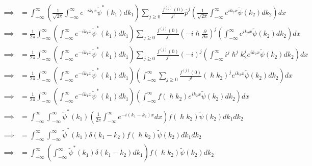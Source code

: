 \documentclass[addpoints]{exam}
\begin{document}
\begin{questions}
\begin{solution}
\begin{enumerate}
\begin{equation*}
\begin{aligned}
                          \implies                         & = \int_{-\infty}^{\infty} \left(\frac{1}{\sqrt{2\pi}}\int_{-\infty}^{\infty}e^{-ik_1x}\tilde{\psi}^*(k_1)dk_1\right)\sum_{j\geq 0}\frac{f^{(j)}(0)}{j!}\hat{p}^j\left(\frac{1}{\sqrt{2\pi}}\int_{-\infty}^{\infty}e^{ik_2x}\tilde{\psi}(k_2)dk_2\right) dx                 \\
                          \implies                         & = \frac{1}{2\pi}\int_{-\infty}^{\infty} \left(\int_{-\infty}^{\infty}e^{-ik_1x}\tilde{\psi}^*(k_1)dk_1\right)\sum_{j\geq 0}\frac{f^{(j)}(0)}{j!}\left(-i\hslash \frac{\partial}{\partial x} \right)^j\left(\int_{-\infty}^{\infty}e^{ik_2x}\tilde{\psi}(k_2)dk_2\right) dx \\
                          \implies                         & = \frac{1}{2\pi}\int_{-\infty}^{\infty} \left(\int_{-\infty}^{\infty}e^{-ik_1x}\tilde{\psi}^*(k_1)dk_1\right)\sum_{j\geq 0}\frac{f^{(j)}(0)}{j!}(-i)^j\left(\int_{-\infty}^{\infty}i^j\hslash^jk_2^je^{ik_2x}\tilde{\psi}(k_2)dk_2\right) dx                               \\
                          \implies                         & = \frac{1}{2\pi}\int_{-\infty}^{\infty} \left(\int_{-\infty}^{\infty}e^{-ik_1x}\tilde{\psi}^*(k_1)dk_1\right)\left(\int_{-\infty}^{\infty}\sum_{j\geq 0}\frac{f^{(j)}(0)}{j!}(\hslash k_2)^je^{ik_2x}\tilde{\psi}(k_2)dk_2\right) dx                                       \\
                          \implies                         & = \frac{1}{2\pi}\int_{-\infty}^{\infty} \left(\int_{-\infty}^{\infty}e^{-ik_1x}\tilde{\psi}^*(k_1)dk_1\right)\left(\int_{-\infty}^{\infty}f(\hslash k_2)e^{ik_2x}\tilde{\psi}(k_2)dk_2\right) dx                                                                           \\
                          \implies                         & = \int_{-\infty}^{\infty} \int_{-\infty}^{\infty}\tilde{\psi}^*(k_1)\left(\frac{1}{2\pi}\int_{-\infty}^{\infty}e^{-i(k_1-k_2)x}dx\right)f(\hslash k_2) \tilde{\psi}(k_2) dk_1dk_2                                                                                          \\
                          \implies                         & = \int_{-\infty}^{\infty} \int_{-\infty}^{\infty}\tilde{\psi}^*(k_1)\delta(k_1-k_2)f(\hslash k_2) \tilde{\psi}(k_2) dk_1dk_2                                                                                                                                               \\
                          \implies                         & = \int_{-\infty}^{\infty} \left(\int_{-\infty}^{\infty}\tilde{\psi}^*(k_1)\delta(k_1-k_2)dk_1\right)f(\hslash k_2) \tilde{\psi}(k_2) dk_2                                                                                                                                  \\

\end{aligned}
\end{equation*}
\end{enumerate}
\end{solution}
\end{questions}
\end{document}
